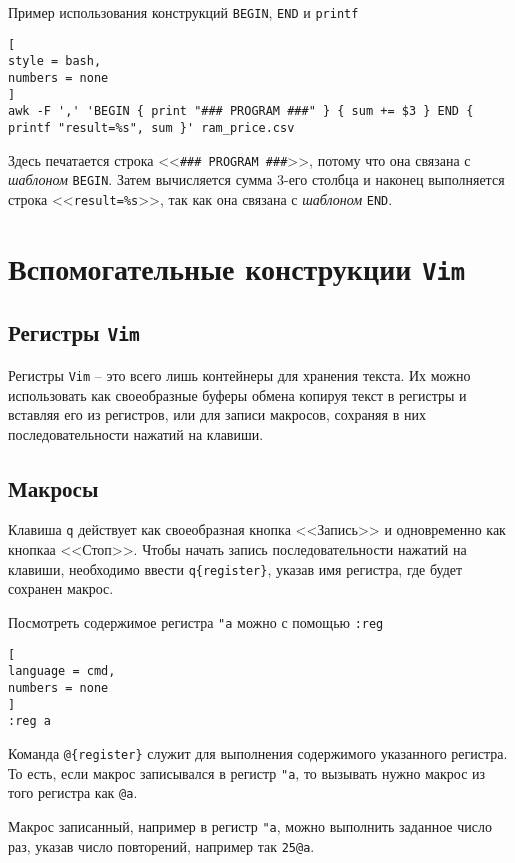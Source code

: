 \documentclass[%
	11pt,
	a4paper,
	utf8,
		]{article}
\begin{document}
Пример использования конструкций \texttt{BEGIN}, \texttt{END} и \texttt{printf}
\begin{lstlisting}[
style = bash,
numbers = none
]
awk -F ',' 'BEGIN { print "### PROGRAM ###" } { sum += $3 } END { printf "result=%s", sum }' ram_price.csv
\end{lstlisting}

Здесь печатается строка <<\verb|### PROGRAM ###|>>, потому что она связана с \emph{шаблоном} \texttt{BEGIN}. Затем вычисляется сумма 3-его столбца и наконец выполняется строка <<\verb|result=%s|>>, так как она связана с \emph{шаблоном} \texttt{END}.



\section{Вспомогательные конструкции \texttt{Vim}}

\subsection{Регистры \texttt{Vim}}

Регистры \texttt{Vim} -- это всего лишь контейнеры для хранения текста. Их можно использовать как своеобразные буферы обмена копируя текст в регистры и вставляя его из регистров, или для записи макросов, сохраняя в них последовательности нажатий на клавиши.

\subsection{Макросы}

Клавиша \texttt{q} действует как своеобразная кнопка <<Запись>> и одновременно как кнопкаа <<Стоп>>. Чтобы начать запись последовательности нажатий на клавиши, необходимо ввести \verb|q{register}|, указав имя регистра, где будет сохранен макрос. 

Посмотреть содержимое регистра \verb|"a| можно с помощью \texttt{:reg}
\begin{lstlisting}[
language = cmd,
numbers = none
]
:reg a
\end{lstlisting}

Команда \verb|@{register}| служит для выполнения содержимого указанного регистра. То есть, если макрос записывался в регистр \verb|"a|, то вызывать нужно макрос из того регистра как \verb|@a|.

Макрос записанный, например в регистр \texttt{"a}, можно выполнить заданное число раз, указав число повторений, например так \verb|25@a|.
\end{document}
